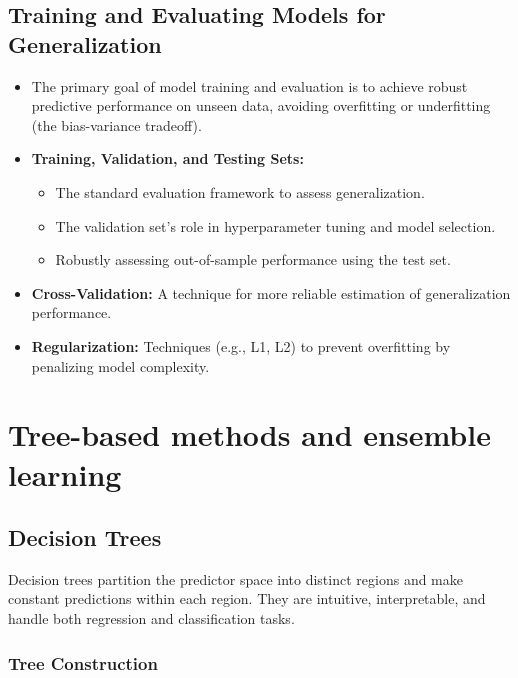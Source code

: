 \documentclass[
  letterpaper,
  DIV=11,
  numbers=noendperiod]{scrreprt}
\providecommand{\tightlist}{%
  \setlength{\itemsep}{0pt}\setlength{\parskip}{0pt}}
\begin{document}
\subsection{Training and Evaluating Models for
Generalization}\label{training-and-evaluating-models-for-generalization}

\begin{itemize}
\tightlist
\item
  The primary goal of model training and evaluation is to achieve robust
  predictive performance on unseen data, avoiding overfitting or
  underfitting (the bias-variance tradeoff).
\item
  \textbf{Training, Validation, and Testing Sets:}

  \begin{itemize}
  \tightlist
  \item
    The standard evaluation framework to assess generalization.
  \item
    The validation set's role in hyperparameter tuning and model
    selection.
  \item
    Robustly assessing out-of-sample performance using the test set.
  \end{itemize}
\item
  \textbf{Cross-Validation:} A technique for more reliable estimation of
  generalization performance.
\item
  \textbf{Regularization:} Techniques (e.g., L1, L2) to prevent
  overfitting by penalizing model complexity.
\end{itemize}

\section{Tree-based methods and ensemble
learning}\label{tree-based-methods-and-ensemble-learning}

\subsection{Decision Trees}\label{decision-trees}

Decision trees partition the predictor space into distinct regions and
make constant predictions within each region. They are intuitive,
interpretable, and handle both regression and classification tasks.

\subsubsection{Tree Construction}\label{tree-construction}
\end{document}
